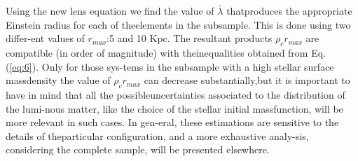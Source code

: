 \documentclass[10pt]{article}
\begin{document}
\begin{multicols}{2}
Using the new lens equation we find the value of \(\bar{\lambda}\) thatproduces the appropriate Einstein radius for each of theelements in the subsample.  This is done using two differ-ent values of \(r_{max}\):5 and 10 Kpc.  The resultant products \(\rho_{c}r_{max}\) are compatible (in order of magnitude) with theinequalities obtained from Eq.  (\ref{eq:6}).  Only for those sys-tems in the subsample with a high stellar surface massdensity  the  value  of \(\rho_{c}r_{max}\) can  decrease  substantially,but it is important to have in mind that all the possibleuncertainties associated to the distribution of the lumi-nous  matter,  like  the  choice  of  the  stellar  initial  massfunction,  will  be  more  relevant  in  such  cases.   In  gen-eral, these estimations are sensitive to the details of theparticular  configuration,  and  a  more  exhaustive  analy-sis,  considering  the  complete  sample,  will  be  presented elsewhere.

\end{multicols}
\end{document}
